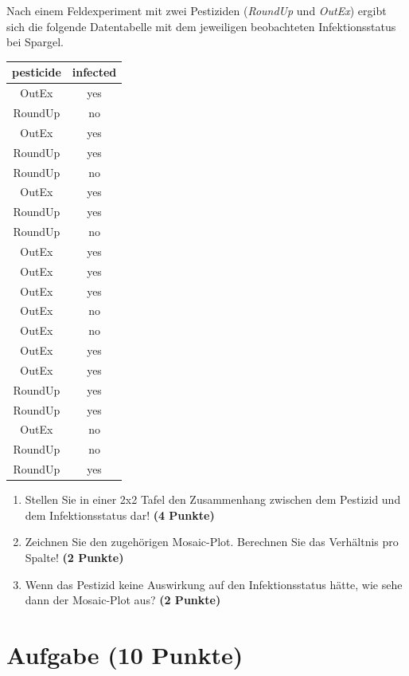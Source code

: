 \documentclass[a4paper, 9pt]{scrartcl}\usepackage[]{graphicx}\usepackage[]{xcolor}
\begin{document}
Nach einem Feldexperiment mit zwei Pestiziden (\textit{RoundUp} und
\textit{OutEx}) ergibt sich die folgende Datentabelle mit dem jeweiligen
beobachteten Infektionsstatus bei Spargel.

\begin{table}[!h]
\centering
\begin{tabular}{cc}
\toprule
pesticide & infected\\
\midrule
OutEx & yes\\
RoundUp & no\\
OutEx & yes\\
RoundUp & yes\\
RoundUp & no\\
\addlinespace
OutEx & yes\\
RoundUp & yes\\
RoundUp & no\\
OutEx & yes\\
OutEx & yes\\
\addlinespace
OutEx & yes\\
OutEx & no\\
OutEx & no\\
OutEx & yes\\
OutEx & yes\\
\addlinespace
RoundUp & yes\\
RoundUp & yes\\
OutEx & no\\
RoundUp & no\\
RoundUp & yes\\
\bottomrule
\end{tabular}
\end{table}



\begin{enumerate}
\item Stellen Sie in einer 2x2 Tafel den Zusammenhang zwischen dem
  Pestizid und dem Infektionsstatus dar! \textbf{(4 Punkte)}
\item Zeichnen Sie den zugeh{\"o}rigen Mosaic-Plot. Berechnen Sie das
  Verh{\"a}ltnis pro Spalte! \textbf{(2 Punkte)}
\item Wenn das Pestizid keine Auswirkung auf den Infektionsstatus h{\"a}tte, wie
  sehe dann der Mosaic-Plot aus? \textbf{(2 Punkte)}
\end{enumerate} 
\clearpage

\section{Aufgabe \hfill (10 Punkte)}
\end{document}
